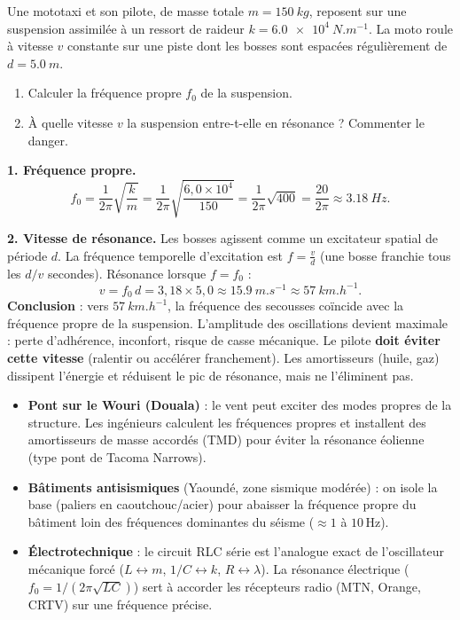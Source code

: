\documentclass[11pt]{article}
\newcommand{\cle}[1]{{\popxbold\color{popdark}#1}}
\begin{document}
\begin{exoresolu}
Une mototaxi et son pilote, de masse totale $m = \SI{150}{kg}$, reposent sur une suspension assimilée à un ressort de raideur $k = \SI{6,0e4}{N.m^{-1}}$. La moto roule à vitesse $v$ constante sur une piste dont les bosses sont espacées régulièrement de $d = \SI{5,0}{m}$.
\begin{enumerate}
\item Calculer la fréquence propre $f_0$ de la suspension.
\item À quelle vitesse $v$ la suspension entre-t-elle en résonance ? Commenter le danger.
\end{enumerate}
\tcblower
\textbf{1. Fréquence propre.}
\[ f_0 = \frac{1}{2\pi}\sqrt{\frac{k}{m}} = \frac{1}{2\pi}\sqrt{\frac{6{,}0\times 10^{4}}{150}} = \frac{1}{2\pi}\sqrt{400} = \frac{20}{2\pi} \approx \SI{3,18}{Hz}. \]

\textbf{2. Vitesse de résonance.}
Les bosses agissent comme un excitateur spatial de période $d$. La fréquence temporelle d'excitation est $f = \frac{v}{d}$ (une bosse franchie tous les $d/v$ secondes).
Résonance lorsque $f = f_0$ :
\[ v = f_0\,d = 3{,}18 \times 5{,}0 \approx \SI{15,9}{m.s^{-1}} \approx \SI{57}{km.h^{-1}}. \]
\textbf{Conclusion} : vers $\SI{57}{km.h^{-1}}$, la fréquence des secousses coïncide avec la fréquence propre de la suspension. L'amplitude des oscillations devient maximale : perte d'adhérence, inconfort, risque de casse mécanique. Le pilote \textbf{doit éviter cette vitesse} (ralentir ou accélérer franchement). Les amortisseurs (huile, gaz) dissipent l'énergie et réduisent le pic de résonance, mais ne l'éliminent pas.
\end{exoresolu}

\begin{savaistu}
\begin{itemize}
\item \textbf{Pont sur le Wouri (Douala)} : le vent peut exciter des modes propres de la structure. Les ingénieurs calculent les fréquences propres et installent des \cle{amortisseurs de masse accordés} (TMD) pour éviter la résonance éolienne (type pont de Tacoma Narrows).
\item \textbf{Bâtiments antisismiques} (Yaoundé, zone sismique modérée) : on isole la base (paliers en caoutchouc/acier) pour abaisser la fréquence propre du bâtiment loin des fréquences dominantes du séisme ($\approx 1$ à $10\,\mathrm{Hz}$).
\item \textbf{Électrotechnique} : le circuit RLC série est l'analogue exact de l'oscillateur mécanique forcé ($L \leftrightarrow m$, $1/C \leftrightarrow k$, $R \leftrightarrow \lambda$). La résonance électrique ($f_0 = 1/(2\pi\sqrt{LC})$) sert à accorder les récepteurs radio (MTN, Orange, CRTV) sur une fréquence précise.
\end{itemize}
\end{savaistu}
\end{document}
